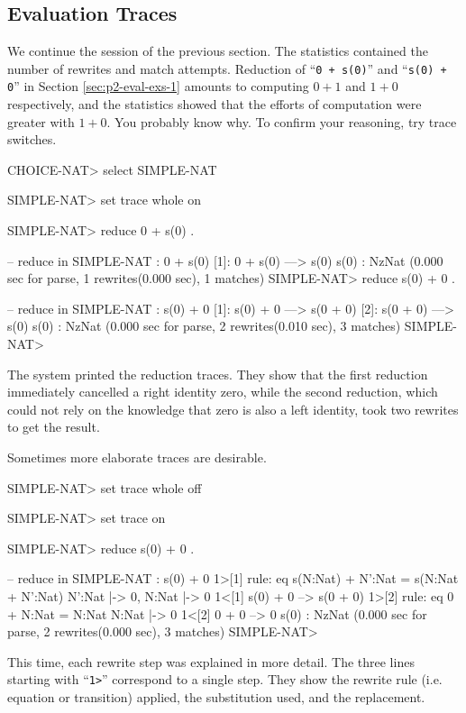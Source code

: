 \documentclass[a4paper]{memoir}
\begin{document}
\subsection{Evaluation Traces}\label{sec:p2-eval-trace}

We continue the session of the previous section.
The statistics contained the number of rewrites and match attempts.
Reduction of ``\verb|0 + s(0)|'' and ``\verb|s(0) + 0|'' in Section
\ref{sec:p2-eval-exs-1} amounts to computing $0 + 1$ and $1 + 0$
respectively, and the statistics showed that the efforts of computation
were greater with $1 + 0$. You probably know why. To confirm your reasoning,
try trace switches.
\begin{vvtm}
\begin{ccode}
  CHOICE-NAT> select SIMPLE-NAT

  SIMPLE-NAT> set trace whole on

  SIMPLE-NAT> reduce 0 + s(0) .

  -- reduce in SIMPLE-NAT : 0 + s(0)
  [1]: 0 + s(0)
   ---> s(0)
  s(0) : NzNat
  (0.000 sec for parse, 1 rewrites(0.000 sec), 1 matches)
  SIMPLE-NAT> reduce s(0) + 0 .

  -- reduce in SIMPLE-NAT : s(0) + 0
  [1]: s(0) + 0
   ---> s(0 + 0)
  [2]: s(0 + 0)
   ---> s(0)
  s(0) : NzNat
  (0.000 sec for parse, 2 rewrites(0.010 sec), 3 matches)
  SIMPLE-NAT> 
\end{ccode}
\end{vvtm}
The system printed the reduction traces. They show that the
first reduction immediately cancelled a right identity zero,
while the second reduction, which could not rely on the knowledge
that zero is also a left identity, took two rewrites to
get the result.

Sometimes more elaborate traces are desirable.
\begin{vvtm}
\begin{ccode}
  SIMPLE-NAT> set trace whole off

  SIMPLE-NAT> set trace on

  SIMPLE-NAT> reduce s(0) + 0 .

  -- reduce in SIMPLE-NAT : s(0) + 0
   1>[1] rule: eq s(N:Nat) + N':Nat = s(N:Nat + N':Nat)
       { N':Nat |-> 0, N:Nat |-> 0 }
   1<[1] s(0) + 0 --> s(0 + 0)
   1>[2] rule: eq 0 + N:Nat = N:Nat
       { N:Nat |-> 0 }
   1<[2] 0 + 0 --> 0
  s(0) : NzNat
  (0.000 sec for parse, 2 rewrites(0.000 sec), 3 matches)
  SIMPLE-NAT> 
\end{ccode}
\end{vvtm}
This time, each rewrite step was explained in more detail.
The three lines starting with ``\verb|1>|'' correspond to a
single step. They show the rewrite rule (i.e. equation or
transition) applied, the substitution used, and the replacement.
\end{document}
